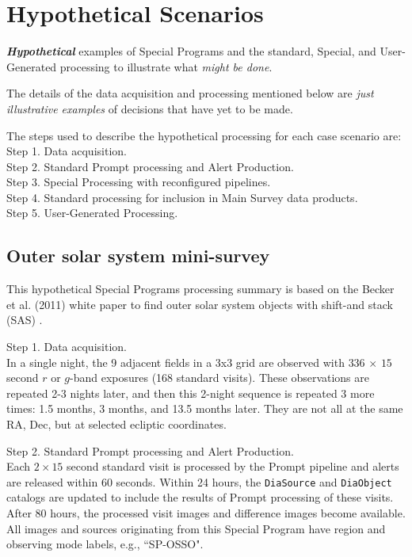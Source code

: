 \section{Hypothetical Scenarios}\label{sec:spcs}

\textbf{\emph{Hypothetical}} examples of Special Programs
and the standard, Special, and User-Generated processing
to illustrate what \emph{might be done}.

The details of the data acquisition and processing mentioned below are 
\emph{just illustrative examples} of decisions that have yet to be made.

The steps used to describe the hypothetical processing for each case scenario are: \\
Step 1. Data acquisition. \\
Step 2. Standard Prompt processing and Alert Production. \\
Step 3. Special Processing with reconfigured pipelines. \\
Step 4. Standard processing for inclusion in Main Survey data products. \\
Step 5. User-Generated Processing. \\

\subsection{Outer solar system mini-survey}\label{ssec:SPCS_TNO}

This hypothetical Special Programs processing summary is based on the Becker et al. (2011) 
white paper to find outer solar system objects with shift-and stack (SAS) .

Step 1. Data acquisition. \\
In a single night, the 9 adjacent fields in a 3x3 grid are observed with 
$336$ $\times$ $15$ second $r$ or $g$-band exposures (168 standard visits). 
These observations are repeated 2-3 nights later, and then this 2-night sequence
is repeated 3 more times: 1.5 months, 3 months, and 13.5 months later. 
They are not all at the same RA, Dec, but at selected ecliptic coordinates.

Step 2. Standard Prompt processing and Alert Production. \\
Each $2\times15$ second standard visit is processed by the Prompt pipeline 
and alerts are released within 60 seconds.
Within 24 hours, the {\tt DiaSource} and {\tt DiaObject} catalogs are updated
to include the results of Prompt processing of these visits.
After 80 hours, the processed visit images and difference images become available.
All images and sources originating from this Special Program have 
region and observing mode labels, e.g., ``SP-OSSO".

